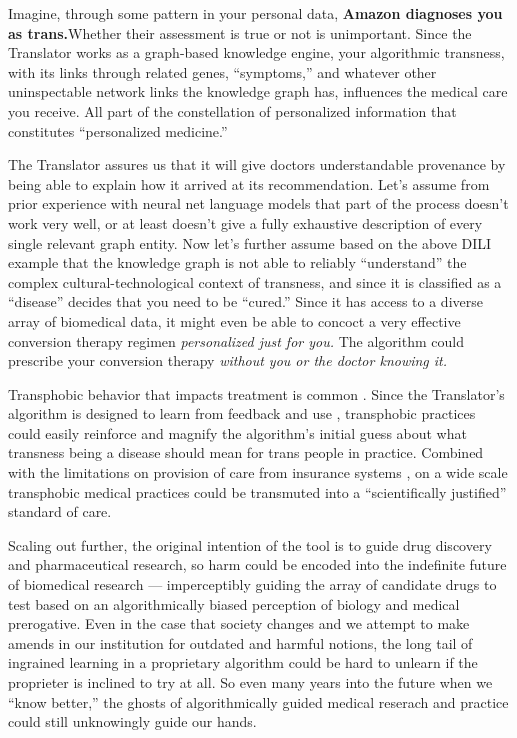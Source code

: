 \documentclass[10pt]{article}
\begin{document}
\begin{multicols}{2}
Imagine, through some pattern in your personal data, \textbf{Amazon
diagnoses you as trans.}Whether their assessment is true or not is
unimportant. Since the Translator works as a graph-based knowledge
engine, your algorithmic transness, with its links through related
genes, ``symptoms,'' and whatever other uninspectable network links the
knowledge graph has, influences the medical care you receive. All part
of the constellation of personalized information that constitutes
``personalized medicine.''

The Translator assures us that it will give doctors understandable
provenance by being able to explain how it arrived at its
recommendation. Let's assume from prior experience with neural net
language models that part of the process doesn't work very well, or at
least doesn't give a fully exhaustive description of every single
relevant graph entity. Now let's further assume based on the above DILI
example that the knowledge graph is not able to reliably ``understand''
the complex cultural-technological context of transness, and since it is
classified as a ``disease'' decides that you need to be ``cured.'' Since
it has access to a diverse array of biomedical data, it might even be
able to concoct a very effective conversion therapy regimen
\emph{personalized just for you.} The algorithm could prescribe your
conversion therapy \emph{without you or the doctor knowing it.}

Transphobic behavior that impacts treatment is common \cite{ramTransphobiaEncodedExamination2021, strangioCanReproductiveTrans2016} . Since the Translator's algorithm is designed to learn from
feedback and use\cite{consortiumUniversalBiomedicalData2019} ,
transphobic practices could easily reinforce and magnify the algorithm's
initial guess about what transness being a disease should mean for trans
people in practice. Combined with the limitations on provision of care
from insurance systems \cite{strangioCanReproductiveTrans2016} ,
on a wide scale transphobic medical practices could be transmuted into a
``scientifically justified'' standard of care.

Scaling out further, the original intention of the tool is to guide drug
discovery and pharmaceutical research, so harm could be encoded into the
indefinite future of biomedical research --- imperceptibly guiding the
array of candidate drugs to test based on an algorithmically biased
perception of biology and medical prerogative. Even in the case that
society changes and we attempt to make amends in our institution for
outdated and harmful notions, the long tail of ingrained learning in a
proprietary algorithm could be hard to unlearn if the proprieter is
inclined to try at all. So even many years into the future when we
``know better,'' the ghosts of algorithmically guided medical reserach
and practice could still unknowingly guide our hands.


\end{multicols}
\end{document}
